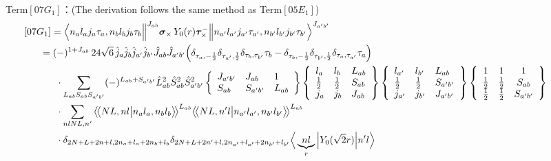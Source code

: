 \documentclass[master]{shnuthesis}
\newcommand{\llangle}{\big\langle\!\big\langle}
\newcommand{\rrangle}{\big\rangle\!\big\rangle}
\newcommand{\ap}{a^\prime}
\newcommand{\bp}{b^\prime}
\newcommand{\il}{\!\!\!\!\!\!\!\!\!\!}
\newcommand{\ii}{\!\!\!\!\!\!\!\!\!\!\!\!\!\!\!\!\!\!\!\!}
\begin{document}
\,\\
{\color{red}Term$[07G_1]$：}(The derivation follows the same method as Term$[05E_1]$)
\begin{align}
    &\ii [07G_1] = \Big\langle n_a l_a j_a \tau_a, n_b l_b j_b \tau_b \Big\|^{J_{ab}} \bm{\sigma}_\times \,Y_0(r) \bm{\tau}_\times^- \Big\| n_{\ap} l_{\ap} j_{\ap} \tau_{\ap}, n_{\bp} l_{\bp} j_{\bp} \tau_{\bp} \Big\rangle^{J_{\ap \bp}} \\
    &\il = (-)^{1+J_{ab}}\,24\sqrt{6}\,\hat{j}_a\hat{j}_b\hat{j}_{\ap}\hat{j}_{\bp}\hat{J}_{ab}\hat{J}_{\ap\bp} \Big( \delta_{\tau_a,-\frac{1}{2}}\delta_{\tau_{\ap},\frac{1}{2}}\delta_{\tau_b,\tau_{\bp}}\tau_b - \delta_{\tau_b,-\frac{1}{2}}\delta_{\tau_{\bp},\frac{1}{2}}\delta_{\tau_a,\tau_{\ap}}\tau_a \Big) \notag\\
    & \cdot \sum_{L_{ab}S_{ab}S_{\ap\bp}} (-)^{L_{ab}+S_{\ap\bp}} \hat{L}_{ab}^2\hat{S}_{ab}^2\hat{S}_{\ap\bp}^2  \left\{\begin{array}{lll} J_{\ap\bp} & J_{ab} & 1 \\ S_{ab} & S_{\ap\bp} & L_{ab} \end{array}\right\}  \left\{\begin{array}{lll}l_{a} & l_{b} & L_{ab} \\ \frac{1}{2} & \frac{1}{2} & S_{ab} \\j_{a} & j_{b} & J_{ab} \end{array}\right\} \left\{\begin{array}{lll}l_{\ap} & l_{\bp} & L_{ab} \\ \frac{1}{2} & \frac{1}{2} & S_{\ap\bp} \\j_{\ap} & j_{\bp} & J_{\ap\bp} \end{array}\right\}  \left\{\begin{array}{ccc} 1 & 1 & 1 \\ \frac{1}{2} & \frac{1}{2} & S_{ab} \\ \frac{1}{2} & \frac{1}{2} & S_{\ap\bp} \end{array}\right\}  \notag \\
    & \cdot \sum_{nlNL,n^\prime} \llangle N L, n l \big| n_{a} l_{a}, n_{b} l_{b} \rrangle^{L_{ab}} \llangle N L, n^\prime l \big| n_{a^\prime} l_{a^\prime}, n_{b^\prime} l_{b^\prime} \rrangle^{L_{ab}} \notag\\
    & \cdot \delta_{2N+L+2n+l,2n_a+l_a+2n_b+l_b}\delta_{2N+L+2n^\prime+l,2n_{a^\prime}+l_{a^\prime}+2n_{b^\prime}+l_{b^\prime}}  \Big\langle \underbrace{n l}_{r} \Big| Y_0(\sqrt{2}r) \Big| n^\prime l \Big\rangle
\end{align}
\end{document}
